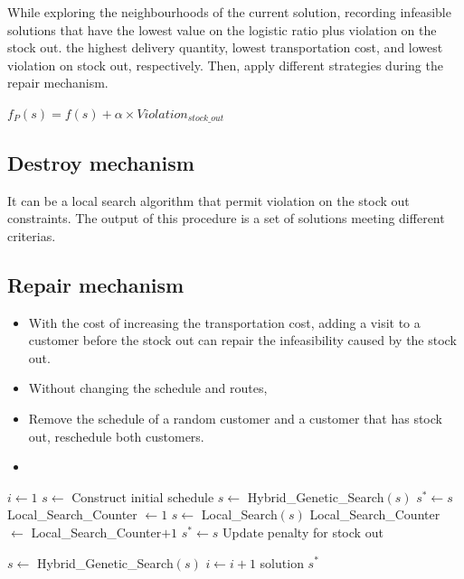 \documentclass{article}
\begin{document}
While exploring the neighbourhoods of the current solution, recording infeasible solutions that have the lowest value on the logistic ratio plus violation on the stock out. the highest delivery quantity, lowest transportation cost, and lowest violation on stock out, respectively. Then, apply different strategies during the repair mechanism.

$f_{P}(s) = f(s) + \alpha \times Violation_{stock\_out}$



\subsection{Destroy mechanism}

It can be a local search algorithm that permit violation on the stock out constraints. The output of this procedure is a set of solutions meeting different criterias. 

\subsection{Repair mechanism}

\begin{itemize}
    \item With the cost of increasing the transportation cost, adding a visit to a customer before the stock out can repair the infeasibility caused by the stock out.
    \item Without changing the schedule and routes,
    \item Remove the schedule of a random customer and a customer that has stock out, reschedule both customers.
    \item 
    
\end{itemize}


\begin{algorithm}[H]
\caption{\textbf{Main algorithm}}
\begin{algorithmic}[1]
\STATE $i\gets 1$
\STATE $s\gets$ Construct initial schedule 
\STATE $s\gets$ Hybrid\_Genetic\_Search$(s)$
    \STATE $s^*\gets s$
\ENDIF
\STATE Local\_Search\_Counter $\gets 1$
    \STATE $s\gets$ Local\_Search$(s)$
    \STATE Local\_Search\_Counter $\gets$ Local\_Search\_Counter$+1$
        \STATE $s^*\gets s$
    \ENDIF
    \STATE Update penalty for stock out
    
\ENDWHILE
\STATE $s\gets$ Hybrid\_Genetic\_Search$(s)$
\STATE $i\gets i+1$
\ENDWHILE
\RETURN solution $s^*$
\end{algorithmic}
\end{algorithm}
\end{document}
